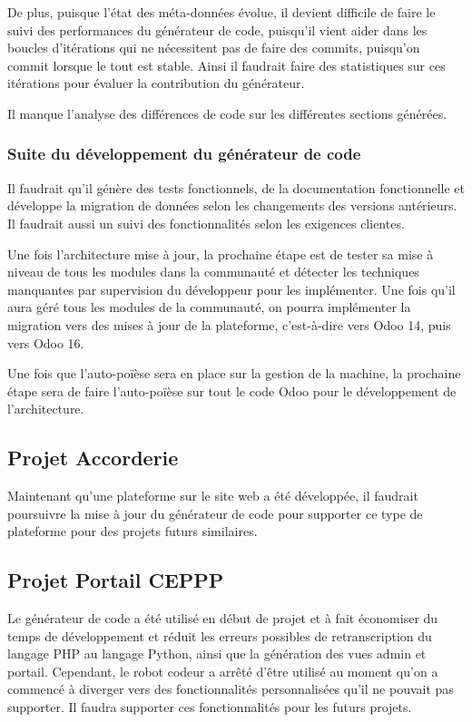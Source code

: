 De plus, puisque l’état des méta-données évolue, il devient difficile de faire le suivi des performances du générateur de code, puisqu’il vient aider dans les boucles d’itérations qui ne nécessitent pas de faire des commits, puisqu’on commit lorsque le tout est stable. Ainsi il faudrait faire des statistiques sur ces itérations pour évaluer la contribution du générateur.

Il manque l’analyse des différences de code sur les différentes sections générées.

\subsubsection{Suite du développement du générateur de code}
Il faudrait qu’il génère des tests fonctionnels, de la documentation fonctionnelle et développe la migration de données selon les changements des versions antérieurs. Il faudrait aussi un suivi des fonctionnalités selon les exigences clientes.

Une fois l’architecture mise à jour, la prochaine étape est de tester sa mise à niveau de tous les modules dans la communauté et détecter les techniques manquantes par supervision du développeur pour les implémenter. Une fois qu’il aura géré tous les modules de la communauté, on pourra implémenter la migration vers des mises à jour de la plateforme, c’est-à-dire vers Odoo 14, puis vers Odoo 16.

Une fois que l’auto-poïèse sera en place sur la gestion de la machine, la prochaine étape sera de faire l’auto-poïèse sur tout le code Odoo pour le développement de l’architecture.

\subsection{Projet Accorderie}
Maintenant qu’une plateforme sur le site web a été développée, il faudrait poursuivre la mise à jour du générateur de code pour supporter ce type de plateforme pour des projets futurs similaires.


\subsection{Projet Portail CEPPP}
Le générateur de code a été utilisé en début de projet et à fait économiser du temps de développement et réduit les erreurs possibles de retranscription du langage PHP au langage Python, ainsi que la génération des vues admin et portail. Cependant, le robot codeur a arrêté d’être utilisé au moment qu’on a commencé à diverger vers des fonctionnalités personnalisées qu’il ne pouvait pas supporter. Il faudra supporter ces fonctionnalités pour les futurs projets.


